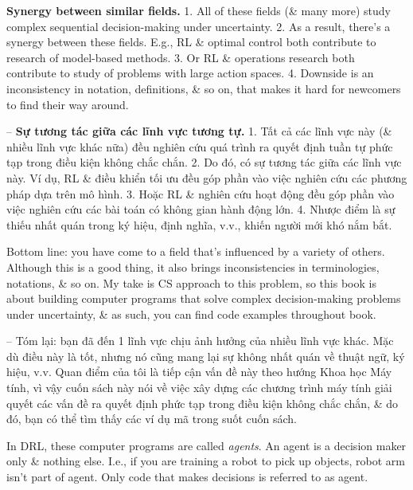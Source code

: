 \documentclass{article}
\begin{document}
\begin{itemize}
\begin{itemize}
\begin{itemize}
            {\bf Synergy between similar fields.} 1. All of these fields (\& many more) study complex sequential decision-making under uncertainty. 2. As a result, there's a synergy between these fields. E.g., RL \& optimal control both contribute to research of model-based methods. 3. Or RL \& operations research both contribute to study of problems with large action spaces. 4. Downside is an inconsistency in notation, definitions, \& so on, that makes it hard for newcomers to find their way around.

            -- {\bf Sự tương tác giữa các lĩnh vực tương tự.} 1. Tất cả các lĩnh vực này (\& nhiều lĩnh vực khác nữa) đều nghiên cứu quá trình ra quyết định tuần tự phức tạp trong điều kiện không chắc chắn. 2. Do đó, có sự tương tác giữa các lĩnh vực này. Ví dụ, RL \& điều khiển tối ưu đều góp phần vào việc nghiên cứu các phương pháp dựa trên mô hình. 3. Hoặc RL \& nghiên cứu hoạt động đều góp phần vào việc nghiên cứu các bài toán có không gian hành động lớn. 4. Nhược điểm là sự thiếu nhất quán trong ký hiệu, định nghĩa, v.v., khiến người mới khó nắm bắt.

            Bottom line: you have come to a field that's influenced by a variety of others. Although this is a good thing, it also brings inconsistencies in terminologies, notations, \& so on. My take is CS approach to this problem, so this book is about building computer programs that solve complex decision-making problems under uncertainty, \& as such, you can find code examples throughout book.

            -- Tóm lại: bạn đã đến 1 lĩnh vực chịu ảnh hưởng của nhiều lĩnh vực khác. Mặc dù điều này là tốt, nhưng nó cũng mang lại sự không nhất quán về thuật ngữ, ký hiệu, v.v. Quan điểm của tôi là tiếp cận vấn đề này theo hướng Khoa học Máy tính, vì vậy cuốn sách này nói về việc xây dựng các chương trình máy tính giải quyết các vấn đề ra quyết định phức tạp trong điều kiện không chắc chắn, \& do đó, bạn có thể tìm thấy các ví dụ mã trong suốt cuốn sách.

            In DRL, these computer programs are called {\it agents}. An agent is a decision maker only \& nothing else. I.e., if you are training a robot to pick up objects, robot arm isn't part of agent. Only code that makes decisions is referred to as agent.


\end{itemize}
\end{itemize}
\end{itemize}
\end{document}
